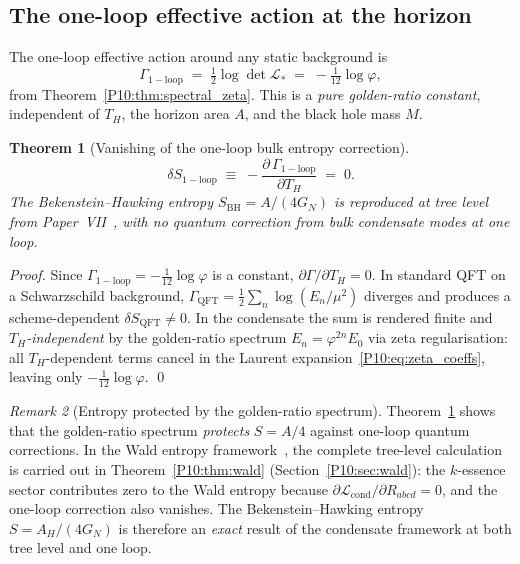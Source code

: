 \documentclass[11pt,a4paper]{article}
\newtheorem{theorem}{Theorem}[section]
\theoremstyle{definition}
\theoremstyle{remark}
\newtheorem{remark}[theorem]{Remark}
\newcommand{\vp}{\varphi}
\begin{document}
\subsection{The one-loop effective action at the horizon}

The one-loop effective action around any static background is
\begin{equation}
  \Gamma_\mathrm{1-loop}
  \;=\; \tfrac{1}{2}\log\det\mathcal{L}_*
  \;=\; -\tfrac{1}{12}\log\vp,
  \label{P10:eq:Gamma_1loop}
\end{equation}
from Theorem~\ref{P10:thm:spectral_zeta}.
This is a \emph{pure golden-ratio constant}, independent of $T_H$,
the horizon area $A$, and the black hole mass $M$.

\begin{theorem}[Vanishing of the one-loop bulk entropy correction]
\label{P10:thm:entropy_correction}
\begin{equation}
  \boxed{\delta S_\mathrm{1-loop}
  \;\equiv\; -\frac{\partial\,\Gamma_\mathrm{1-loop}}{\partial T_H}
  \;=\; 0}.
  \label{P10:eq:delta_S_zero}
\end{equation}
The Bekenstein--Hawking entropy $S_\mathrm{BH} = A/(4G_N)$
is reproduced at tree level from Paper~VII~\cite{Paper7},
with no quantum correction from bulk condensate modes at one loop.
\end{theorem}

\begin{proof}
Since $\Gamma_\mathrm{1-loop} = -\tfrac{1}{12}\log\vp$ is a constant,
$\partial\Gamma/\partial T_H = 0$.
In standard QFT on a Schwarzschild background,
$\Gamma_\mathrm{QFT} = \tfrac{1}{2}\sum_n\log(E_n/\mu^2)$
diverges and produces a scheme-dependent $\delta S_\mathrm{QFT}\neq0$.
In the condensate the sum is rendered finite and
\emph{$T_H$-independent} by the golden-ratio spectrum $E_n=\vp^{2n}E_0$
via zeta regularisation: all $T_H$-dependent terms cancel in the
Laurent expansion~\eqref{P10:eq:zeta_coeffs}, leaving only
$-\tfrac{1}{12}\log\vp$.
\qed
\end{proof}

\begin{remark}[Entropy protected by the golden-ratio spectrum]
\label{P10:rem:entropy_protected}
Theorem~\ref{P10:thm:entropy_correction} shows that the golden-ratio
spectrum \emph{protects} $S = A/4$ against one-loop quantum corrections.
In the Wald entropy framework~\cite{Wald1993}, the complete tree-level
calculation is carried out in Theorem~\ref{P10:thm:wald} (Section~\ref{P10:sec:wald}):
the $k$-essence sector contributes zero to the Wald entropy because
$\partial\mathcal{L}_\mathrm{cond}/\partial R_{abcd}=0$, and the
one-loop correction also vanishes.
The Bekenstein--Hawking entropy $S = A_H/(4G_N)$ is therefore
an \emph{exact} result of the condensate framework at both tree level
and one loop.
\end{remark}
\end{document}
